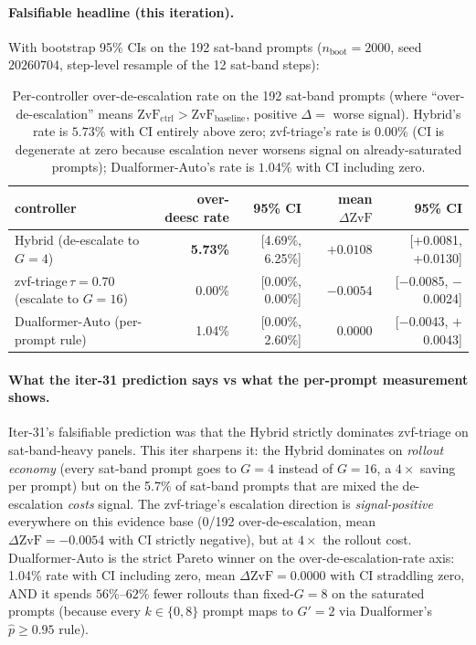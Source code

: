 \documentclass{article}
\begin{document}
\paragraph{Falsifiable headline (this iteration).}
With bootstrap 95\% CIs on the 192 sat-band prompts
($n_\mathrm{boot}{=}2000$, seed~$20260704$, step-level resample of the
12 sat-band steps):

\begin{table}[t]
\centering
\caption{Per-controller over-de-escalation rate on the 192 sat-band
prompts (where ``over-de-escalation'' means $\mathrm{ZvF}_\mathrm{ctrl} > \mathrm{ZvF}_\text{baseline}$,
positive $\Delta =$ worse signal). Hybrid's rate is $5.73\%$ with CI
entirely above zero; zvf-triage's rate is $0.00\%$ (CI is degenerate at
zero because escalation never worsens signal on already-saturated
prompts); Dualformer-Auto's rate is $1.04\%$ with CI including zero.}
\label{tab:p7-satband-overdeesc}
\begin{tabular}{lrrrr}
\toprule
controller & over-deesc rate & 95\% CI & mean $\Delta\mathrm{ZvF}$ & 95\% CI \\
\midrule
Hybrid (de-escalate to $G{=}4$) & \textbf{5.73\%} & [4.69\%, 6.25\%] & $+0.0108$ & [+0.0081, +0.0130] \\
zvf-triage$\,\tau{=}0.70$ (escalate to $G{=}16$) & 0.00\% & [0.00\%, 0.00\%] & $-0.0054$ & [$-$0.0085, $-$0.0024] \\
Dualformer-Auto (per-prompt rule) & 1.04\% & [0.00\%, 2.60\%] & $0.0000$ & [$-$0.0043, $+$0.0043] \\
\bottomrule
\end{tabular}
\end{table}

\paragraph{What the iter-31 prediction says vs what the per-prompt
measurement shows.}
Iter-31's falsifiable prediction was that the Hybrid strictly
dominates zvf-triage on sat-band-heavy panels. This iter sharpens it:
the Hybrid dominates on \emph{rollout economy} (every sat-band prompt
goes to $G{=}4$ instead of $G{=}16$, a $4\times$ saving per prompt)
but on the 5.7\% of sat-band prompts that are mixed the de-escalation
\emph{costs} signal. The zvf-triage's escalation direction is
\emph{signal-positive} everywhere on this evidence base (0/192
over-de-escalation, mean $\Delta\mathrm{ZvF}=-0.0054$ with CI strictly
negative), but at $4\times$ the rollout cost. Dualformer-Auto is the
strict Pareto winner on the over-de-escalation-rate axis: 1.04\% rate
with CI including zero, mean $\Delta\mathrm{ZvF}=0.0000$ with CI
straddling zero, AND it spends $56\%$--$62\%$ fewer rollouts than
fixed-$G{=}8$ on the saturated prompts (because every $k \in \{0,8\}$
prompt maps to $G'=2$ via Dualformer's $\hat p \ge 0.95$ rule).
\end{document}
